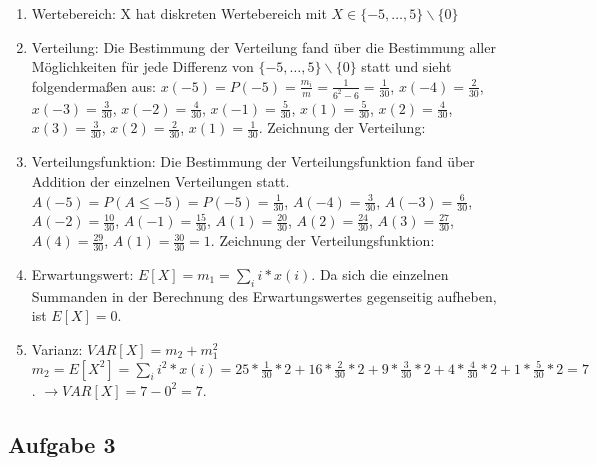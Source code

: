 \documentclass[%
10pt,              %
ngerman,           %
a4paper,           %
DIV11,             %
]{scrartcl}%
\begin{document}
\begin{enumerate}
	\item Wertebereich: X hat diskreten Wertebereich mit $X \in \{-5, \dots, 5 \} \backslash \{0\}$
	\item Verteilung: Die Bestimmung der Verteilung fand über die Bestimmung aller Möglichkeiten für jede Differenz von $\{-5, \dots, 5 \} \backslash \{0\}$ statt und sieht folgendermaßen aus:\newline
	$x(-5) = P(-5) = \frac{m_i}{m} = \frac{1}{6^2 - 6} = \frac{1}{30}$,\newline
	$x(-4) = \frac{2}{30}$, $x(-3) = \frac{3}{30}$, $x(-2) = \frac{4}{30}$, $x(-1) = \frac{5}{30}$, $x(1) = \frac{5}{30}$, $x(2) = \frac{4}{30}$, $x(3) = \frac{3}{30}$, $x(2) = \frac{2}{30}$, $x(1) = \frac{1}{30}$. Zeichnung der Verteilung: 
	
	\item Verteilungsfunktion: Die Bestimmung der Verteilungsfunktion fand über Addition der einzelnen Verteilungen statt.\newline
	$A(-5) = P(A \leq -5) = P(-5) = \frac{1}{30}$,\newline
	$A(-4) = \frac{3}{30}$, $A(-3) = \frac{6}{30}$, $A(-2) = \frac{10}{30}$, $A(-1) = \frac{15}{30}$, $A(1) = \frac{20}{30}$, $A(2) = \frac{24}{30}$, $A(3) = \frac{27}{30}$, $A(4) = \frac{29}{30}$, $A(1) = \frac{30}{30} = 1$. Zeichnung der Verteilungsfunktion: 
	
	\item Erwartungswert: $E[X] = m_1 = \sum_{i} i * x(i)$. Da sich die einzelnen Summanden in der Berechnung des Erwartungswertes gegenseitig aufheben, ist $E[X] = 0$.
	\item Varianz: $VAR[X] = m_2 + m_1^2$\newline
	$m_2 = E[X^2] = \sum_{i} i^2 * x(i) = 25 * \frac{1}{30} * 2 + 16 * \frac{2}{30} * 2 + 9 * \frac{3}{30} * 2 + 4 * \frac{4}{30} * 2 + 1 * \frac{5}{30} * 2 = 7$.\newline
	$\rightarrow VAR[X] = 7 - 0^2 = 7$.
\end{enumerate}

\subsection*{Aufgabe 3}
\end{document}
